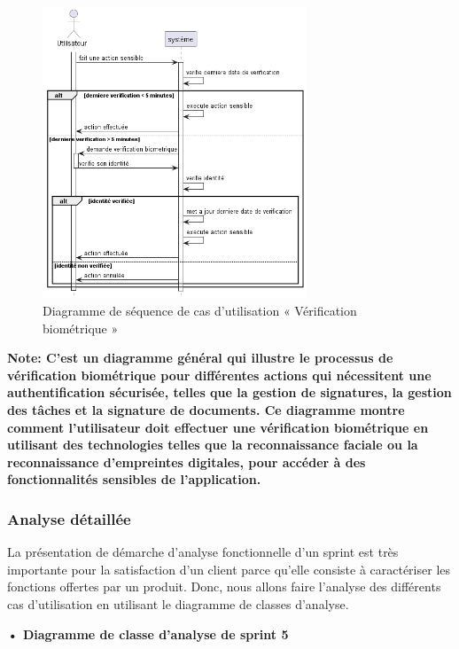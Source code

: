 \begin{figure}[H]
  \centering
  \includegraphics[width=0.7\textwidth]{out/diagrams/sprint5/verification_biometrique/verification_biometrique}
  \caption{Diagramme de séquence de cas d'utilisation « Vérification biométrique »}
  \label{fig:sequence_verification_biometrique}
\end{figure}  
\textbf{Note: C'est un diagramme général qui illustre le processus de vérification biométrique pour différentes actions qui nécessitent une authentification sécurisée, telles que la gestion de signatures, la gestion des tâches et la signature de documents. Ce diagramme montre comment l'utilisateur doit effectuer une vérification biométrique en utilisant des technologies telles que la reconnaissance faciale ou la reconnaissance d'empreintes digitales, pour accéder à des fonctionnalités sensibles de l'application.}


\subsubsection{Analyse détaillée}
La présentation de démarche d'analyse fonctionnelle d'un sprint est très importante pour la satisfaction d'un client parce qu'elle consiste à caractériser les fonctions offertes par un produit.
Donc, nous allons faire l'analyse des différents cas d'utilisation en utilisant le diagramme de classes d'analyse.


\setlength{\parskip}{1em}
\setlength{\parindent}{0em}

\textbf{•	Diagramme de classe d'analyse de sprint 5 }


